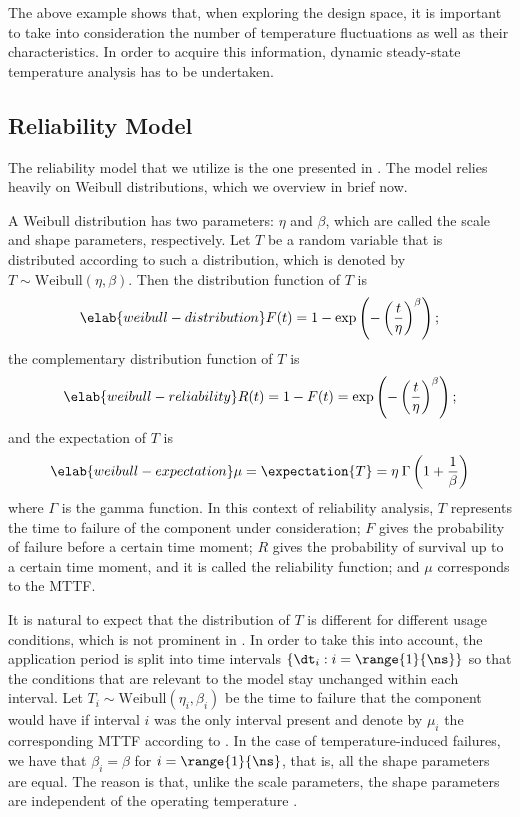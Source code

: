 The above example shows that, when exploring the design space, it is important
to take into consideration the number of temperature fluctuations as well as
their characteristics. In order to acquire this information, dynamic
steady-state temperature analysis has to be undertaken.

\subsection{Reliability Model}
\newcommand{\mean}{\mu}
\newcommand{\scale}{\eta}
\newcommand{\shape}{\beta}

The reliability model that we utilize is the one presented in \cite{huang2009b,
xiang2010}. The model relies heavily on Weibull distributions, which we overview
in brief now.

A Weibull distribution has two parameters: $\scale$ and $\shape$, which are
called the scale and shape parameters, respectively. Let $T$ be a random
variable that is distributed according to such a distribution, which is denoted
by $T \sim \mathrm{Weibull}(\scale, \shape)$. Then the distribution function
\cite{durrett2010} of $T$ is
\begin{equation} \elab{weibull-distribution}
  F(t) = 1 - \exp\left(-\left(\frac{t}{\scale}\right)^\shape\right);
\end{equation}
the complementary distribution function of $T$ is
\begin{equation} \elab{weibull-reliability}
  R(t) = 1 - F(t) = \exp\left(-\left(\frac{t}{\scale}\right)^\shape\right);
\end{equation}
and the expectation of $T$ is
\begin{equation} \elab{weibull-expectation}
  \mean = \expectation{T} = \scale \: \Gamma\left(1 + \frac{1}{\shape}\right)
\end{equation}
where $\Gamma$ is the gamma function. In this context of reliability analysis,
$T$ represents the time to failure of the component under consideration; $F$
gives the probability of failure before a certain time moment; $R$ gives the
probability of survival up to a certain time moment, and it is called the
reliability function; and $\mean$ corresponds to the \ac{MTTF}.

It is natural to expect that the distribution of $T$ is different for different
usage conditions, which is not prominent in . In
order to take this into account, the application period \period is split into
\ns time intervals $\{ \dt_i: i = \range{1}{\ns} \}$ so that the conditions that
are relevant to the model stay unchanged within each interval. Let $T_i \sim
\mathrm{Weibull}(\scale_i, \shape_i)$ be the time to failure that the component
would have if interval $i$ was the only interval present and denote by $\mean_i$
the corresponding \ac{MTTF} according to . In the case
of temperature-induced failures, we have that $\shape_i = \shape$ for $i =
\range{1}{\ns}$, that is, all the shape parameters are equal. The reason is
that, unlike the scale parameters, the shape parameters are independent of the
operating temperature \cite{chang2006}.

